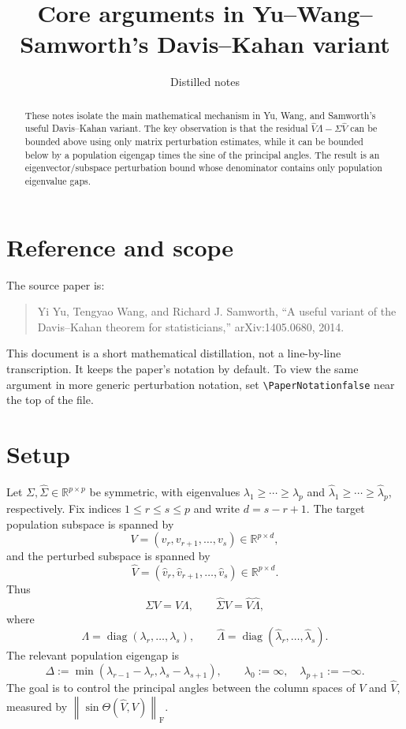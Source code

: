 \documentclass[11pt]{article}
\title{Core arguments in Yu--Wang--Samworth's Davis--Kahan variant}
\author{Distilled notes}
\date{}
\newif\ifPaperNotation
\newcommand{\BaseMat}{\Sigma}
\newcommand{\PertMat}{\widehat{\Sigma}}
\newcommand{\Sub}{V}
\newcommand{\Subhat}{\widehat V}
\newcommand{\EigDiag}{\Lambda}
\newcommand{\EigDiagHat}{\widehat\Lambda}
\newcommand{\BaseMat}{A}
\newcommand{\PertMat}{\widetilde A}
\newcommand{\Sub}{Q}
\newcommand{\Subhat}{\widetilde Q}
\newcommand{\EigDiag}{D}
\newcommand{\EigDiagHat}{\widetilde D}
\newcommand{\R}{\mathbb R}
\newcommand{\gap}{\Delta}
\newcommand{\norm}[1]{\left\lVert #1 \right\rVert}
\newcommand{\F}{\mathrm F}
\newcommand{\diag}{\operatorname{diag}}
\theoremstyle{remark}
\begin{document}
\maketitle

\begin{abstract}
These notes isolate the main mathematical mechanism in Yu, Wang, and
Samworth's useful Davis--Kahan variant.  The key observation is that the
residual $\Subhat\EigDiag-\BaseMat\Subhat$ can be bounded above using only
matrix perturbation estimates, while it can be bounded below by a
population eigengap times the sine of the principal angles.  The result is
an eigenvector/subspace perturbation bound whose denominator contains only
population eigenvalue gaps.
\end{abstract}

\section{Reference and scope}

The source paper is:
\begin{quote}
Yi Yu, Tengyao Wang, and Richard J. Samworth,
``A useful variant of the Davis--Kahan theorem for statisticians,''
arXiv:1405.0680, 2014.
\end{quote}

This document is a short mathematical distillation, not a line-by-line
transcription.  It keeps the paper's notation by default.  To view the same
argument in more generic perturbation notation, set
\verb|\PaperNotationfalse| near the top of the file.

\section{Setup}

Let $\BaseMat,\PertMat\in\R^{p\times p}$ be symmetric, with eigenvalues
$\lambda_1\geq\cdots\geq\lambda_p$ and
$\widehat\lambda_1\geq\cdots\geq\widehat\lambda_p$, respectively.  Fix
indices $1\leq r\leq s\leq p$ and write $d=s-r+1$.  The target population
subspace is spanned by
\[
  \Sub=(v_r,v_{r+1},\ldots,v_s)\in\R^{p\times d},
\]
and the perturbed subspace is spanned by
\[
  \Subhat=(\widehat v_r,\widehat v_{r+1},\ldots,\widehat v_s)
  \in\R^{p\times d}.
\]
Thus
\[
  \BaseMat\Sub=\Sub\EigDiag,
  \qquad
  \PertMat\Subhat=\Subhat\EigDiagHat,
\]
where
\[
  \EigDiag=\diag(\lambda_r,\ldots,\lambda_s),
  \qquad
  \EigDiagHat=\diag(\widehat\lambda_r,\ldots,\widehat\lambda_s).
\]
The relevant population eigengap is
\[
  \gap := \min(\lambda_{r-1}-\lambda_r,\lambda_s-\lambda_{s+1}),
  \qquad
  \lambda_0:=\infty,\quad \lambda_{p+1}:=-\infty.
\]
The goal is to control the principal angles between the column spaces of
$\Sub$ and $\Subhat$, measured by $\norm{\sin\Theta(\Subhat,\Sub)}_{\F}$.
\end{document}
